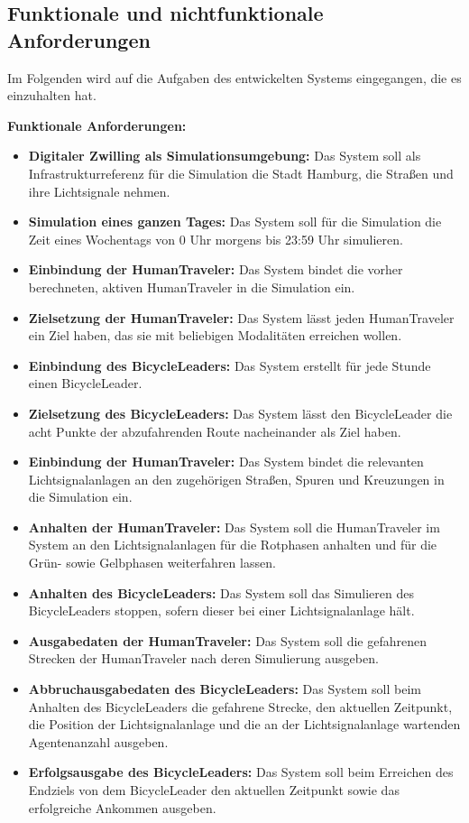 %

\subsection{Funktionale und nichtfunktionale Anforderungen}\label{subsec:requirements}

Im Folgenden wird auf die Aufgaben des entwickelten Systems eingegangen, die es einzuhalten hat.

\textbf{Funktionale Anforderungen:}

\begin{itemize}
    \item \textbf{Digitaler Zwilling als Simulationsumgebung:} Das System soll als Infrastrukturreferenz für die Simulation die Stadt Hamburg, die Straßen und ihre Lichtsignale nehmen.
    \item \textbf{Simulation eines ganzen Tages:} Das System soll für die Simulation die Zeit eines Wochentags von 0 Uhr morgens bis 23:59 Uhr simulieren.
    \item \textbf{Einbindung der HumanTraveler:} Das System bindet die vorher berechneten, aktiven HumanTraveler in die Simulation ein.
    \item \textbf{Zielsetzung der HumanTraveler:} Das System lässt jeden HumanTraveler ein Ziel haben, das sie mit beliebigen Modalitäten erreichen wollen.
    \item \textbf{Einbindung des BicycleLeaders:} Das System erstellt für jede Stunde einen BicycleLeader.
    \item \textbf{Zielsetzung des BicycleLeaders:} Das System lässt den BicycleLeader die acht Punkte der abzufahrenden Route nacheinander als Ziel haben.
    \item \textbf{Einbindung der HumanTraveler:} Das System bindet die relevanten Lichtsignalanlagen an den zugehörigen Straßen, Spuren und Kreuzungen in die Simulation ein.
    \item \textbf{Anhalten der HumanTraveler:} Das System soll die HumanTraveler im System an den Lichtsignalanlagen für die Rotphasen anhalten und für die Grün- sowie Gelbphasen weiterfahren lassen.
    \item \textbf{Anhalten des BicycleLeaders:} Das System soll das Simulieren des BicycleLeaders stoppen, sofern dieser bei einer Lichtsignalanlage hält.
    \item \textbf{Ausgabedaten der HumanTraveler:} Das System soll die gefahrenen Strecken der HumanTraveler nach deren Simulierung ausgeben.
    \item \textbf{Abbruchausgabedaten des BicycleLeaders:} Das System soll beim Anhalten des BicycleLeaders die gefahrene Strecke, den aktuellen Zeitpunkt, die Position der Lichtsignalanlage und die an der Lichtsignalanlage wartenden Agentenanzahl ausgeben.
    \item \textbf{Erfolgsausgabe des BicycleLeaders:} Das System soll beim Erreichen des Endziels von dem BicycleLeader den aktuellen Zeitpunkt sowie das erfolgreiche Ankommen ausgeben.
\end{itemize}

